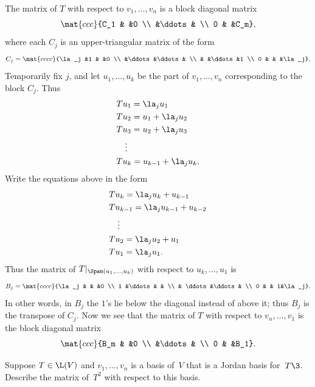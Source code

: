\begin{Solution}
The matrix of $T$ with respect to $v_1, \dots, v_n$ is a block diagonal matrix
\[
\mat{ccc}{C_1 & &0 \\ &\ddots & \\ 0 & &C_m},
\]
where each\/ $C_j$ is an upper-triangular matrix of the form
\[
C_j = \mat{cccc}{\la_j &1 & &0 \\
&\ddots &\ddots & \\
& &\ddots &1 \\
0 & & &\la_j}.
\]
Temporarily fix $j$, and let $u_1, \dots, u_k$ be the part of $v_1, \dots, v_n$
corresponding to the block $C_j$.  Thus
\begin{align*}
&Tu_1 = \la_j u_1 \\
&Tu_2 = u_1 + \la_j u_2 \\
&Tu_3 = u_2 + \la_j u_3 \\
&\quad \vdots \\
&Tu_k = u_{k-1} + \la_j u_k.
\end{align*}
Write the equations above in the form
\begin{align*}
&Tu_k = \la_j u_k + u_{k-1} \\
&Tu_{k-1} = \la_j u_{k-1} + u_{k-2} \\
&\quad \vdots \\
&Tu_2 = \la_j u_2 + u_1\\
&Tu_1 =\la_j u_1.
\end{align*}
Thus the matrix of $T|_{\Span(u_1, \dots, u_k)}$ with respect to
$u_k, \dots, u_1$ is
\[
B_j = \mat{cccc}{\la_j & & &0 \\
1 &\ddots & & \\
& \ddots&\ddots & \\
0 & & 1&\la_j}.
\]
In other words, in $B_j$ the $1$'s lie below the diagonal instead of above it; thus $B_j$ is the transpose of $C_j$. Now we see that the
matrix of $T$ with respect to $v_n, \dots, v_1$ is the block diagonal matrix
\[
\mat{ccc}{B_m & &0 \\ &\ddots & \\ 0 & &B_1}.
\]
\end{Solution}

\exercise
Suppose $T \in \L(V)$ and $v_1, \dots, v_n$ is a basis of~$V$ that is a Jordan
basis for~$T\3$. Describe the matrix of~$T^2$ with respect to this basis.

